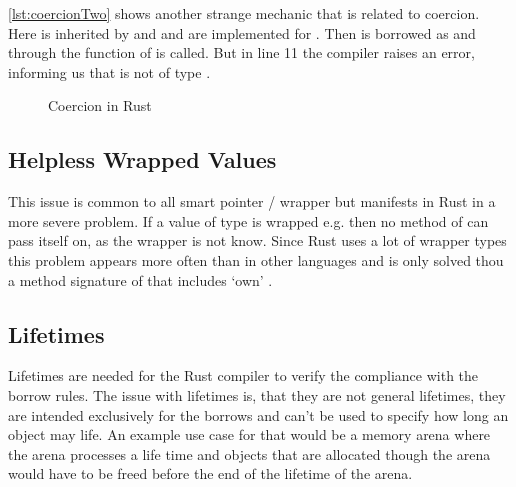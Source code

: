 \documentclass[thesis]{subfiles}
\begin{document}
    \autoref{lst:coercionTwo} shows another strange mechanic that is related to coercion.
    Here \A is inherited by \B and \B and \A are implemented for \Foo.
    Then  is borrowed as \B and through  the function \fun of \A is called.
    But in line 11 the compiler raises an error, informing us that  is not of type .

    \newsavebox{\coercionOne}
    \begin{lrbox}{\coercionOne}
      \begin{minipage}{.45\linewidth}
        
      \end{minipage}
    \end{lrbox}

    \newsavebox{\coercionTwo}
    \begin{lrbox}{\coercionTwo}
      \begin{minipage}{.45\linewidth}
        
      \end{minipage}
    \end{lrbox}

    \begin{figure}[ht]
      \captionsetup{type=lstlisting}
      \hfill%
      \caption{Coercion in Rust}\label{lst:coercion}
    \end{figure}

  \subsection{Helpless Wrapped Values}
    This issue is common to all smart pointer / wrapper but manifests in Rust in a more severe problem.
    If a value of type \T is wrapped e.g. \RcT then no method of \T can pass itself on, as the wrapper is not know.
    Since Rust uses a lot of wrapper types this problem appears more often than in other languages and is only solved thou a method signature of \T that includes `own' \RcT.

  \subsection{Lifetimes}
    Lifetimes are needed for the Rust compiler to verify the compliance with the borrow rules.
    The issue with lifetimes is, that they are not general lifetimes, they are intended exclusively for the borrows and can't be used to specify how long an object may life.
    An example use case for that would be a memory arena where the arena processes a life time and objects that are allocated though the arena would have to be freed before the end of the lifetime of the arena.
\end{document}
